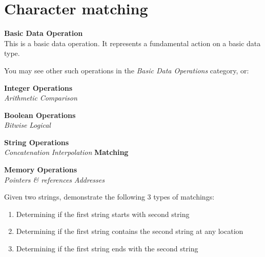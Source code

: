 



\pagebreak{}
\section*{Character matching}


\textbf{Basic Data Operation}\\ This is a basic data operation. It
represents a fundamental action on a basic data type.

You may see other such operations in the \emph{Basic Data Operations}
category, or:

\textbf{Integer Operations} \\
\emph{Arithmetic} \textbar{} \emph{Comparison}

\textbf{Boolean Operations} \\ \emph{Bitwise} \textbar{}
\emph{Logical}

\textbf{String Operations} \\
\emph{Concatenation} \textbar{} \emph{Interpolation} \textbar{}
\textbf{Matching}

\textbf{Memory Operations} \\
\emph{Pointers \& references} \textbar{} \emph{Addresses}

Given two strings, demonstrate the following 3 types of matchings:

\begin{enumerate}
\item
  Determining if the first string starts with second string
\item
  Determining if the first string contains the second string at any
  location
\item
  Determining if the first string ends with the second string
\end{enumerate}


